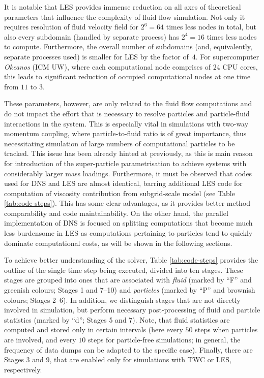 \documentclass{pracamgren}
\begin{document}
It is notable that LES provides immense reduction on all axes of theoretical parameters that influence the complexity of fluid flow simulation.
Not only it requires resolution of fluid velocity field for $2^6 = 64$ times less nodes in total, but also every subdomain (handled by separate process) has $2^4 = 16$ times less nodes to compute.
Furthermore, the overall number of subdomains (and, equivalently, separate processes used) is smaller for LES by the factor of~$4$.
For supercomputer \emph{Okeanos} (ICM UW), where each computational node comprises of $24$ CPU cores, this leads to significant reduction of occupied computational nodes at one time from $11$ to $3$.

These parameters, however, are only related to the fluid flow computations and do not impact the effort that is necessary to resolve particles and particle-fluid interactions in the system.
This is especially vital in simulations with two-way momentum coupling, where particle-to-fluid ratio is of great importance, thus necessitating simulation of large numbers of computational particles to be tracked.
This issue has been already hinted at previously, as this is main reason for introduction of the super-particle parametrisation to achieve systems with considerably larger mass loadings.
Furthermore, it must be observed that codes used for DNS and LES are almost identical, barring additional LES code for computation of viscosity contribution from subgrid-scale model (see Table \ref{tab:code-steps}).
This has some clear advantages, as it provides better method comparability and code maintainability.
On the other hand, the parallel implementation of DNS is focused on splitting computations that become much less burdensome in LES as computations pertaining to particles tend to quickly dominate computational costs, as will be shown in the following sections.

\medskip

To achieve better understanding of the solver, Table \ref{tab:code-steps} provides the outline of the single time step being executed, divided into ten stages.
These stages are grouped into ones that are associated with \emph{fluid} (marked by ``F'' and greenish colours; Stages 1 and 7--10) and \emph{particles} (marked by ``P'' and brownish colours; Stages 2--6).
In addition, we distinguish stages that are not directly involved in simulation, but perform necessary post-processing of fluid and particle statistics (marked by ``d''; Stages 5 and 7).
Note, that fluid statistics are computed and stored only in certain intervals (here every $50$ steps when particles are involved, and every $10$ steps for particle-free simulations; in general, the frequency of data dumps can be adapted to the specific case).
Finally, there are Stages 3 and 9, that are enabled only for simulations with TWC or LES, respectively.
\end{document}
